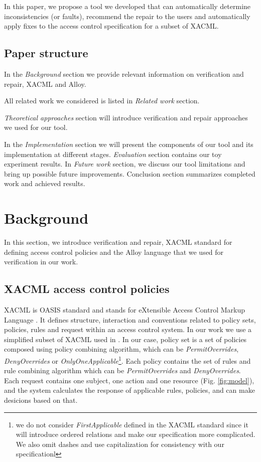 \documentclass{acm_proc_article-sp}
\begin{document}
In this paper, we propose a tool we developed that can automatically determine inconsistencies (or faults), recommend the repair to the users and automatically apply fixes to the access control specification for a subset of XACML.

\subsection{Paper structure}

In the \textit{Background} section we provide relevant information on verification and repair, XACML and Alloy.

All related work we considered is listed in \textit{Related work} section. 

\textit{Theoretical approaches} section will introduce verification and repair approaches we used for our tool. 

In the \textit{Implementation} section we will present the components of our tool and its implementation at different stages. 
\textit{Evaluation} section contains our toy experiment results. In \textit{Future work} section, we discuss our tool limitations and bring up possible future improvements. Conclusion section summarizes completed work and achieved results.

\section{Background}

In this section, we introduce verification and repair, XACML standard for defining access control policies and the Alloy language that we used for verification in our work.

\subsection{XACML access control policies}

XACML is OASIS standard and stands for eXtensible Access Control Markup Language \cite{oasis:xacml}. It defines structure, interaction and conventions related to policy sets, policies, rules and request within an access control system. In our work we use a simplified subset of XACML used in \cite{acp:alloy}. In our case, policy set is a set of policies composed using policy combining algorithm, which can be \textit{PermitOverrides}, \textit{DenyOverrides} or \textit{OnlyOneApplicable}\footnote[2]{we do not consider \textit{FirstApplicable} defined in the XACML standard \cite{oasis:xacml} since it will introduce ordered relations and make our specification more complicated. We also omit dashes and use capitalization for consistency with our specificationl}. Each policy contains the set of rules and rule combining algorithm which can be \textit{PermitOverrides} and \textit{DenyOverrides}. Each request contains one subject, one action and one resource (Fig. \ref{fig:model}), and the system calculates the response of applicable rules, policies, and can make desicions based on that. 
\end{document}
